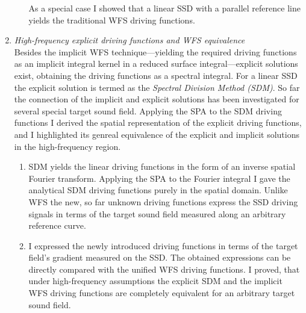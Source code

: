 \documentclass[a4paper,10pt]{article}
\begin{document}
\begin{enumerate}
\begin{enumerate}
As a special case I showed that a linear SSD with a parallel reference line yields the traditional WFS driving functions.
\end{enumerate}
%
\item \emph{High-frequency explicit driving functions and WFS equivalence}\\
Besides the implicit WFS technique---yielding the required driving functions as an implicit integral kernel in a reduced surface integral---explicit solutions exist, obtaining the driving functions as a spectral integral.
For a linear SSD the explicit solution is termed as the \emph{Spectral Division Method (SDM)}.
So far the connection of the implicit and explicit solutions has been investigated for several special target sound field.
Applying the SPA to the SDM driving functions I derived the spatial representation of the explicit driving functions, and I highlighted its genreal equivalence of the explicit and implicit solutions in the high-frequency region.
\begin{enumerate}
\item SDM yields the linear driving functions in the form of an inverse spatial Fourier transform.
Applying the SPA to the Fourier integral I gave the analytical SDM driving functions purely in the spatial domain.
Unlike WFS the new, so far unknown driving functions express the SSD driving signals in terms of the target sound field measured along an arbitrary reference curve.
\item I expressed the newly introduced driving functions in terms of the target field's gradient measured on the SSD.
The obtained expressions can be directly compared with the unified WFS driving functions.
I proved, that under high-frequency assumptions the explicit SDM and the implicit WFS driving functions are completely equivalent for an arbitrary target sound field.
\end{enumerate}


\end{enumerate}
\end{document}
